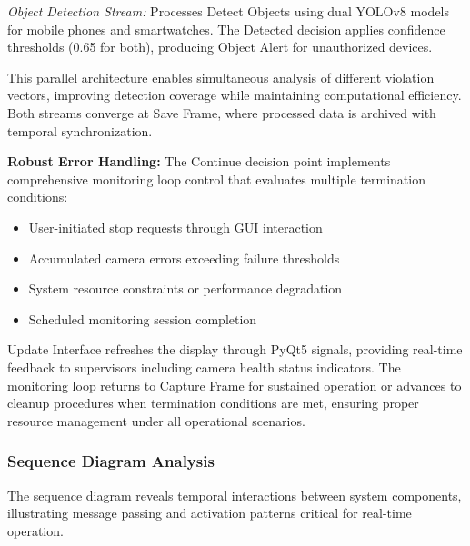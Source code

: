 \documentclass[conference]{IEEEtran}
\begin{document}
\textit{Object Detection Stream:} Processes Detect Objects using 
dual YOLOv8 models for mobile phones and smartwatches. The Detected decision 
applies confidence thresholds (0.65 for both), producing Object Alert 
for unauthorized devices.

This parallel architecture enables simultaneous analysis of different violation 
vectors, improving detection coverage while maintaining computational efficiency. 
Both streams converge at Save Frame, where processed data is archived with 
temporal synchronization.

\textbf{Robust Error Handling:} The Continue decision point implements comprehensive 
monitoring loop control that evaluates multiple termination conditions:
\begin{itemize}
    \item User-initiated stop requests through GUI interaction
    \item Accumulated camera errors exceeding failure thresholds
    \item System resource constraints or performance degradation
    \item Scheduled monitoring session completion
\end{itemize}

Update Interface refreshes the display through PyQt5 signals, providing real-time 
feedback to supervisors including camera health status indicators. The monitoring 
loop returns to Capture Frame for sustained operation or advances to cleanup 
procedures when termination conditions are met, ensuring proper resource 
management under all operational scenarios.

\subsubsection{Sequence Diagram Analysis}

The sequence diagram reveals temporal interactions between system components, illustrating 
message passing and activation patterns critical for real-time operation.
\end{document}
